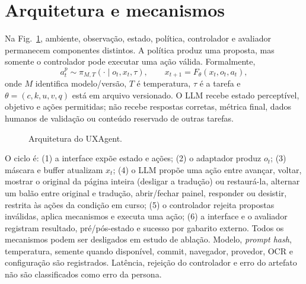 \documentclass[conference]{IEEEtran}
\begin{document}
\section{Arquitetura e mecanismos}
Na Fig.~\ref{fig:arch}, ambiente, observação, estado, política, controlador e avaliador permanecem componentes distintos. A política produz uma proposta, mas somente o controlador pode executar uma ação válida. Formalmente,
\begin{equation}
a_t^{p}\sim\pi_{M,T}(\cdot\mid o_t,x_t,\tau),\qquad
x_{t+1}=F_{\theta}(x_t,o_t,a_t),
\end{equation}
onde $M$ identifica modelo/versão, $T$ é temperatura, $\tau$ é a tarefa e $\theta=(c,k,u,v,q)$ está em arquivo versionado. O LLM recebe estado perceptível, objetivo e ações permitidas; não recebe respostas corretas, métrica final, dados humanos de validação ou conteúdo reservado de outras tarefas.

  \begin{figure}[t]
  \centering
\caption{Arquitetura do UXAgent.}
\label{fig:arch}
\end{figure}

O ciclo é: (1) a interface expõe estado e ações; (2) o adaptador produz $o_t$; (3) máscara e buffer atualizam $x_t$; (4) o LLM propõe uma ação entre avançar, voltar, mostrar o original da página inteira (desligar a tradução) ou restaurá-la, alternar um balão entre original e tradução, abrir/fechar painel, responder ou desistir, restrita às ações da condição em curso; (5) o controlador rejeita propostas inválidas, aplica mecanismos e executa uma ação; (6) a interface e o avaliador registram resultado, pré/pós-estado e sucesso por gabarito externo. Todos os mecanismos podem ser desligados em estudo de ablação. Modelo, \emph{prompt hash}, temperatura, semente quando disponível, commit, navegador, provedor, OCR e configuração são registrados. Latência, rejeição do controlador e erro do artefato não são classificados como erro da persona.
\end{document}
